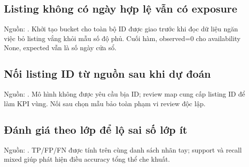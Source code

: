 \documentclass[11pt,a4paper]{article}
\begin{document}
\subsection{Listing không có ngày hợp lệ vẫn có exposure}
\noindent Nguồn: . Khởi tạo bucket cho toàn bộ ID được giao trước khi đọc dữ liệu ngăn việc bỏ listing vắng khỏi mẫu số độ phủ. Cuối hàm, observed=0 cho availability None, expected vẫn là số ngày cửa sổ.

\subsection{Nối listing ID từ nguồn sau khi dự đoán}
\noindent Nguồn: . Mô hình không được yêu cầu bịa ID; review map cung cấp listing ID để làm KPI vùng. Nối sau chọn mẫu bảo toàn phạm vi review độc lập.

\subsection{Đánh giá theo lớp để lộ sai số lớp ít}
\noindent Nguồn: . TP/FP/FN được tính trên cùng danh sách nhãn tay; support và recall mixed giúp phát hiện điều accuracy tổng thể che khuất.
\end{document}

